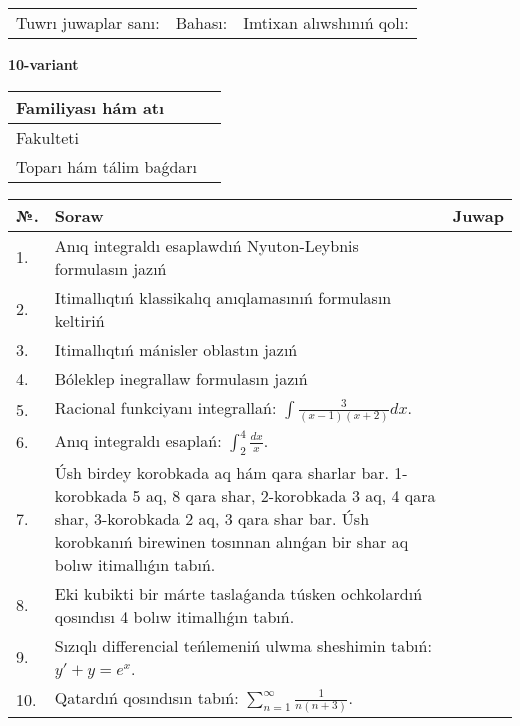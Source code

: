 \documentclass{article}
\begin{document}
\vspace{1cm}

\begin{tabular}{ c c c }
Tuwrı juwaplar sanı: \underline{\hspace{2cm}} & Bahası: \underline{\hspace{2cm}} & Imtixan alıwshınıń qolı: \underline{\hspace{2cm}} \\
\end{tabular}

\newpage

\begin{center}\textbf{10-variant}\end{center}

\bgroup
\def\arraystretch{1.5}
\begin{tabular}{ |m{6cm}|m{10cm}| }
  \hline
  Familiyası hám atı & \\
  \hline
  Fakulteti &\\
  \hline
  Toparı hám tálim baǵdarı & \\
  \hline
\end{tabular}
\egroup

\vspace{0.5cm}

\bgroup
\def\arraystretch{2}
\begin{tabular}{ |l|m{8cm}|m{7cm}| }
  \hline
  №. & Soraw & Juwap \\
  \hline
  1. & Anıq integraldı esaplawdıń Nyuton-Leybnis formulasın jazıń &  \\
  \hline
  2. & Itimallıqtıń klassikalıq anıqlamasınıń formulasın keltiriń &  \\
  \hline
  3. & Itimallıqtıń mánisler oblastın jazıń &  \\
  \hline
  4. & Bóleklep inegrallaw formulasın jazıń &  \\
  \hline
  5. & Racional funkciyanı integrallań: $\displaystyle\int {\frac{3}{(x - 1)(x + 2)}dx}$. &  \\
  \hline
  6. & Anıq integraldı esaplań: $\displaystyle\int_{2}^{4}\frac{dx}{x}$. &  \\
  \hline
  7. & Úsh birdey korobkada aq hám qara sharlar bar. 1-korobkada 5 aq, 8 qara shar, 2-korobkada 3 aq, 4 qara shar, 3-korobkada 2 aq, 3 qara shar bar. Úsh korobkanıń birewinen tosınnan alınǵan bir shar aq bolıw itimallıǵın tabıń. &  \\
  \hline
  8. & Eki kubikti bir márte taslaǵanda túsken ochkolardıń qosındısı 4 bolıw itimallıǵın tabıń. &  \\
  \hline
  9. & Sızıqlı differencial teńlemeniń ulwma sheshimin tabıń: $y' + y =e^{x}$. &  \\
  \hline
  10. & Qatardıń qosındısın tabıń: $\displaystyle\sum_{n = 1}^{\infty}\frac{1}{n(n + 3)}$. &  \\
  \hline
\end{tabular}
\egroup
\end{document}
